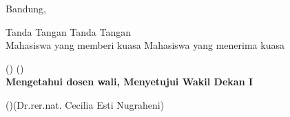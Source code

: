 \documentclass[12pt]{letter}
\begin{document}
{		\begin{flushright}
			Bandung, 
		\end{flushright}
Tanda Tangan \hspace{7.3cm}Tanda Tangan \\
Mahasiswa yang memberi kuasa \hspace{4cm} Mahasiswa yang menerima kuasa \\
\begin{flushright}
		\end{flushright}
			\vspace{1cm}

	()\hspace{4.6cm} ()\\

	\textbf{Mengetahui dosen wali, \hspace{4.8cm} Menyetujui Wakil Dekan I}
	\vspace{2cm}

	()\hspace{4.8cm}(Dr.rer.nat. Cecilia Esti Nugraheni)
	\thispagestyle{empty}
		\newpage

}
 
\end{document}
